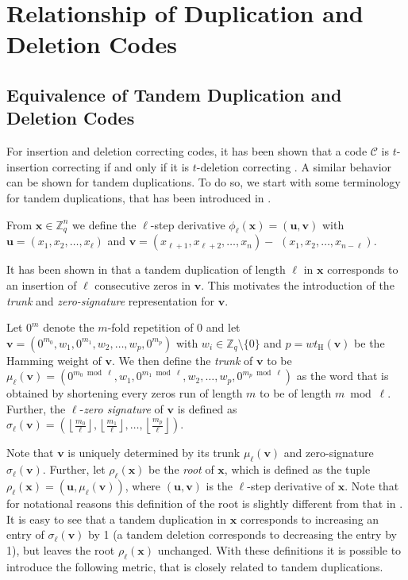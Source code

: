 \documentclass[a4paper]{llncs}
\newcommand{\ve}[1]{\boldsymbol{#1}}
\begin{document}
	\section{Relationship of Duplication and Deletion Codes}
	\label{sec:relationship_duplication_deletion_codes}
	\subsection{Equivalence of Tandem Duplication and Deletion Codes} \label{ss:equivalence_tandem_duplication_deletion_codes}
	For insertion and deletion correcting codes, it has been shown that a code $\mathcal{C}$ is $t$-insertion correcting if and only if it is $t$-deletion correcting \cite{Levenshtein66}. A similar behavior can be shown for tandem duplications. To do so, we start with some terminology for tandem duplications, that has been introduced in \cite{Jain16}.
	\begin{definition}
		From $\ve{x} \in \mathbb{Z}_q^n$ we define the $\ell$-step derivative $\phi_\ell(\ve{x})=(\ve{u}, \ve{v})$ with $\ve{u} = (x_1, x_2, \dots, x_\ell)$ and $\ve{v} = (x_{\ell+1}, x_{\ell+2}, \dots, x_n) - $ $(x_1, x_2, \dots, x_{n-\ell})$.
	\end{definition}
	It has been shown in \cite{Jain16} that a tandem duplication of length $\ell$ in $\ve{x}$ corresponds to an insertion of $\ell$ consecutive zeros in $\ve{v}$. This motivates the introduction of the \emph{trunk} and \emph{zero-signature} representation for $\ve{v}$. 
	\begin{definition}
		Let $0^m$ denote the $m$-fold repetition of $0$ and let $\ve{v} = (0^{m_0},w_1,0^{m_1},w_2, \dots, w_{p}, 0^{m_p})$ with $w_i \in \mathbb{Z}_q \setminus \{0\}$ and $p = wt_{\mathrm{H}}(\ve{v})$ be the Hamming weight of $\ve{v}$. We then define the \emph{trunk} of $\ve{v}$ to be $\mu_\ell(\ve{v}) = (0^{m_0 \bmod \ell},w_1,0^{m_1 \bmod \ell},w_2, \dots, w_{p}, 0^{m_p \bmod \ell})$ as the word that is obtained by shortening every zeros run of length $m$ to be of length $m \bmod \ell$. Further, the $\ell$-\emph{zero signature} of $\ve{v}$ is defined as $\sigma_\ell(\ve{v}) = \left(\left\lfloor\frac{m_0}{\ell}\right\rfloor, \left\lfloor\frac{m_1}{\ell}\right\rfloor, \dots, \left\lfloor\frac{m_p}{\ell}\right\rfloor\right)$.
	\end{definition}
	Note that $\ve{v}$ is uniquely determined by its trunk $\mu_\ell(\ve{v})$ and zero-signature $\sigma_\ell(\ve{v})$. Further, let $\rho_\ell(\ve{x})$ be the \emph{root} of $\ve{x}$, which is defined as the tuple $\rho_\ell(\ve{x}) = (\ve{u}, \mu_\ell(\ve{v}))$, where $(\ve{u}, \ve{v})$ is the $\ell$-step derivative of $\ve{x}$. Note that for notational reasons this definition of the root is slightly different from that in \cite{Jain16}. It is easy to see that a tandem duplication in $\ve{x}$ corresponds to increasing an entry of $\sigma_\ell(\ve{v})$ by 1 (a tandem deletion corresponds to decreasing the entry by 1), but leaves the root $\rho_\ell(\ve{x})$ unchanged. With these definitions it is possible to introduce the following metric, that is closely related to tandem duplications.
\end{document}
